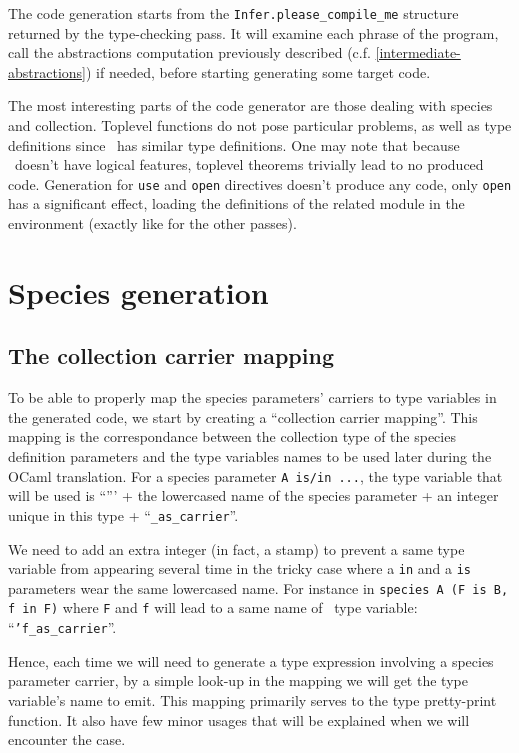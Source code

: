 
The code generation starts from the {\tt Infer.please\_compile\_me}
structure returned by the type-checking pass. It will examine each
phrase of the program, call the abstractions computation previously
described (c.f. \ref{intermediate-abstractions}) if needed, before
starting generating some target code.

The most interesting parts of the code generator are those dealing
with species and collection. Toplevel functions do not pose particular
problems, as well as type definitions since \ocaml\ has similar type
definitions. One may note that because \ocaml\ doesn't have logical
features, toplevel theorems trivially lead to no produced
code. Generation for {\tt use} and {\tt open} directives doesn't
produce any code, only {\tt open} has a significant effect, loading
the definitions of the related module in the environment (exactly like
for the other passes).


\section{Species generation}

\subsection{The collection carrier mapping}
To be able to properly map the species parameters' carriers to
type variables in the generated code, we start by creating a
``collection carrier mapping''. This mapping is the correspondance
between the collection type of the species definition parameters and
the type variables names to be used later during the OCaml
translation. For a species parameter {\tt A is/in ...}, the type
variable that will be used is ``''' + the lowercased name of the
species parameter + an integer unique in this type +
``{\tt \_as\_carrier}''.

We need to add an extra integer (in fact, a stamp) to prevent a same
type variable from appearing several time in the tricky case where a
{\tt in} and a {\tt is} parameters wear the same lowercased name. For
instance in
{\footnotesize\lstinline!species A (F is B, f in F)!}
where {\tt F} and {\tt f} will lead to a same name of \ocaml\ type
variable: ``{\tt 'f\_as\_carrier}''.

Hence, each time we will need to generate a type expression involving
a species parameter carrier, by a simple look-up in the mapping we
will get the type variable's name to emit. This mapping primarily
serves to the type pretty-print function. It also have few minor
usages that will be explained when we will encounter the case.

